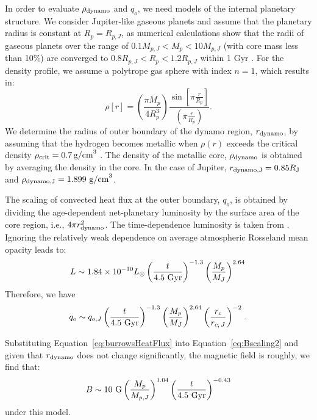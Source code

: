 \documentclass[iop,numberedappendix,apj]{emulateapj}
\begin{document}
In order to evaluate $\rho _{\rm dynamo}$ and $q_o$, we need models of the internal planetary structure. 
We consider Jupiter-like gaseous planets and assume that the planetary radius is constant at $R_p = R_{p,J}$, as numerical calculations show that the radii of gaseous planets over the range of $0.1 M_{p, J} < M_p < 10M_{p, J}$ (with core mass less than 10\%) are converged to $0.8 R_{p, J} < R_p < 1.2R_{p, J}$ within 1 Gyr \citep{fortney2007}. 
For the density profile, we assume a polytrope gas sphere with index $n=1$, which results in:
\begin{equation}
\rho [r] = \left( \frac{\pi M_p}{4 R_p^3} \right) \frac{\sin \left[ \pi \frac{r}{R_p} \right]}{\left( \pi \frac{r}{R_p} \right)}. \label{eq:rho_r}
\end{equation}
We determine the radius of outer boundary of the dynamo region, $r_{\rm dynamo}$, by assuming that the hydrogen becomes metallic when $\rho (r)$ exceeds the critical density $\rho_{\rm crit}=0.7\,\mbox{g/cm}^3$ \citep{exoplanets2006, griesmeier2007b}.
The density of the metallic core, $\rho _{\rm dynamo}$ is obtained by averaging the density in the core. 
In the case of Jupiter, $r_{\rm dynamo, J} = 0.85 R_{\rm J}$ and $\rho_{\rm dynamo, J} = 1.899~{\rm g/cm}^3$.

The scaling of convected heat flux at the outer boundary, $q_o$, is obtained by dividing the age-dependent net-planetary luminosity by the surface area of the core region, i.e., $4\pi r_{\rm dynamo}^2$. 
The time-dependence luminosity is taken from \citet{burrows_et_al2001} \citep[see also][]{marley2007}. 
Ignoring the relatively weak dependence on average atmospheric Rosseland mean opacity leads to:
\begin{equation}
L \sim 1.84\times10^{-10} L_\odot \left( \frac{t}{4.5 \rm~Gyr} \right)^{-1.3} \left( \frac{M_p}{M_J} \right)^{2.64} \, 	
\label{eq:burrowsLum}
\end{equation}
Therefore, we have
\begin{equation}
q_o \sim q_{o, J} \left( \frac{t}{4.5 \rm~Gyr} \right)^{-1.3} \left( \frac{M_p}{M_J} \right)^{2.64} \left( \frac{r_c}{r_{c,\,J}} \right)^{-2}\, .
\label{eq:burrowsHeatFlux}
\end{equation}

Substituting Equation~\ref{eq:burrowsHeatFlux} into Equation~\ref{eq:Bscaling2} and given that $r_{\rm dynamo} $ does not change significantly, the magnetic field is roughly, we find that:
\begin{equation}
B   \sim   10~{\rm G} \left( \frac{M_p }{M_{p,J}} \right)^{1.04} \left( \frac{t}{4.5~\rm{Gyr}} \right)^{-0.43} \label{eq:scalingB}
\end{equation}
under this model. 
\end{document}
